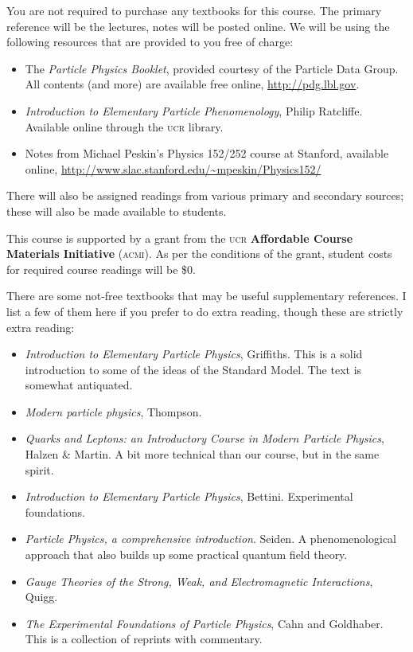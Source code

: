\documentclass[12pt]{article}
\newcommand{\acro}[1]{\textsc{\MakeLowercase{#1}}}
\numberwithin{equation}{section}    %
\begin{document}
You are not required to purchase any textbooks for this course. The primary reference will be the lectures, notes will be posted online.  We will be using the following resources that are provided to you free of charge:
\begin{itemize}
	\item The \emph{Particle Physics Booklet}, provided courtesy of the Particle Data Group. All contents (and more) are available free online, \url{http://pdg.lbl.gov}.
	\item \emph{Introduction to Elementary Particle Phenomenology}, Philip Ratcliffe. Available online through the \acro{UCR} library.
	\item Notes from Michael Peskin's Physics 152/252 course at Stanford, available online, \url{http://www.slac.stanford.edu/~mpeskin/Physics152/}
\end{itemize}
There will also be assigned readings from various primary and secondary sources; these will also be made available to students. 

\begin{framed}
\noindent This course is supported by a grant from the \acro{UCR} \textbf{Affordable Course Materials Initiative} (\acro{ACMI}). As per the conditions of the grant, student costs for required course readings will be \$0. 	
\end{framed}

There are some not-free textbooks that may be useful supplementary references. I list a few of them here if you prefer to do extra reading, though these are strictly extra reading:
\begin{itemize}
	\item \emph{Introduction to Elementary Particle Physics}, Griffiths. This is a solid introduction to some of the ideas of the Standard Model. The text is somewhat antiquated.
	\item \emph{Modern particle physics}, Thompson.
	\item \emph{Quarks and Leptons: an Introductory Course in Modern Particle Physics}, Halzen \& Martin. A bit more technical than our course, but in the same spirit.
	\item \emph{Introduction to Elementary Particle Physics}, Bettini. Experimental foundations.
	\item \emph{Particle Physics, a comprehensive introduction}. Seiden. A phenomenological approach that also builds up some practical quantum field theory.
	\item \emph{Gauge Theories of the Strong, Weak, and Electromagnetic Interactions}, Quigg. %
	\item \emph{The Experimental Foundations of Particle Physics}, Cahn and Goldhaber. This is a collection of reprints with commentary.
\end{itemize}
\end{document}
